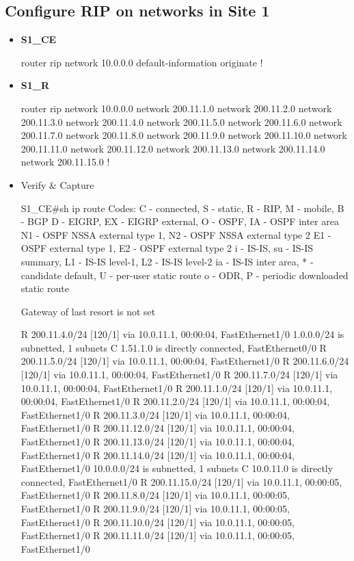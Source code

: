 \documentclass[10pt]{article}
\begin{document}
\subsection{Configure RIP on networks in Site 1} %
\label{sub:configure_rip_on_networks_in_site_1}
\begin{itemize}
	\item {\bf S1\_CE}
	\begin{verbatim*}
		router rip
		 network 10.0.0.0
		 default-information originate
		!
	\end{verbatim*}
	\item {\bf S1\_R}
	\begin{verbatim*}
		router rip
		 network 10.0.0.0
		 network 200.11.1.0
		 network 200.11.2.0
		 network 200.11.3.0
		 network 200.11.4.0
		 network 200.11.5.0
		 network 200.11.6.0
		 network 200.11.7.0
		 network 200.11.8.0
		 network 200.11.9.0
		 network 200.11.10.0
		 network 200.11.11.0
		 network 200.11.12.0
		 network 200.11.13.0
		 network 200.11.14.0
		 network 200.11.15.0
		!
	\end{verbatim*}
	\item {Verify \& Capture}
	\begin{verbatim*}
		S1_CE#sh ip route
		Codes: C - connected, S - static, R - RIP, M - mobile, B - BGP
		       D - EIGRP, EX - EIGRP external, O - OSPF, IA - OSPF inter area
		       N1 - OSPF NSSA external type 1, N2 - OSPF NSSA external type 2
		       E1 - OSPF external type 1, E2 - OSPF external type 2
		       i - IS-IS, su - IS-IS summary, L1 - IS-IS level-1, L2 - IS-IS level-2
		       ia - IS-IS inter area, * - candidate default, U - per-user static route
		       o - ODR, P - periodic downloaded static route

		Gateway of last resort is not set

		R    200.11.4.0/24 [120/1] via 10.0.11.1, 00:00:04, FastEthernet1/0
		     1.0.0.0/24 is subnetted, 1 subnets
		C       1.51.1.0 is directly connected, FastEthernet0/0
		R    200.11.5.0/24 [120/1] via 10.0.11.1, 00:00:04, FastEthernet1/0
		R    200.11.6.0/24 [120/1] via 10.0.11.1, 00:00:04, FastEthernet1/0
		R    200.11.7.0/24 [120/1] via 10.0.11.1, 00:00:04, FastEthernet1/0
		R    200.11.1.0/24 [120/1] via 10.0.11.1, 00:00:04, FastEthernet1/0
		R    200.11.2.0/24 [120/1] via 10.0.11.1, 00:00:04, FastEthernet1/0
		R    200.11.3.0/24 [120/1] via 10.0.11.1, 00:00:04, FastEthernet1/0
		R    200.11.12.0/24 [120/1] via 10.0.11.1, 00:00:04, FastEthernet1/0
		R    200.11.13.0/24 [120/1] via 10.0.11.1, 00:00:04, FastEthernet1/0
		R    200.11.14.0/24 [120/1] via 10.0.11.1, 00:00:04, FastEthernet1/0
		     10.0.0.0/24 is subnetted, 1 subnets
		C       10.0.11.0 is directly connected, FastEthernet1/0
		R    200.11.15.0/24 [120/1] via 10.0.11.1, 00:00:05, FastEthernet1/0
		R    200.11.8.0/24 [120/1] via 10.0.11.1, 00:00:05, FastEthernet1/0
		R    200.11.9.0/24 [120/1] via 10.0.11.1, 00:00:05, FastEthernet1/0
		R    200.11.10.0/24 [120/1] via 10.0.11.1, 00:00:05, FastEthernet1/0
		R    200.11.11.0/24 [120/1] via 10.0.11.1, 00:00:05, FastEthernet1/0




\end{verbatim*}
\end{itemize}
\end{document}

